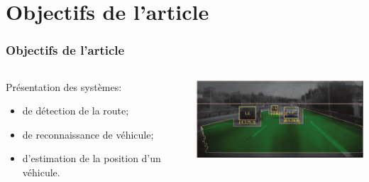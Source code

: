 \section{Objectifs de l'article}
\begin{frame}
    \frametitle{Objectifs de l'article}

    \begin{columns}
        \begin{column}{5cm}
            Présentation des systèmes:
            \begin{itemize}
                \item de détection de la route;
                \item de reconnaissance de véhicule;
                \item d'estimation de la position d'un véhicule.
            \end{itemize}
        \end{column}

        \begin{column}{7cm}
            \begin{center}
                \includegraphics[width=7cm]{image/objectif.png}
            \end{center}
        \end{column}

    \end{columns}
\end{frame}
